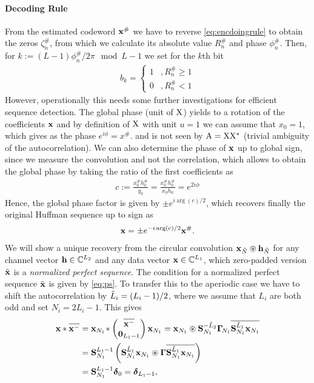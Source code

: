 \documentclass[conference]{IEEEtran}
\begin{document}
\paragraph*{Decoding Rule} From the estimated codeword ${\mathbf x}^{\#}$ we have to reverse \eqref{eq:encdoingrule} to obtain
the zeros $\zeta_n^{\#}$, from which we calculate its absolute value $R_n^{\#}$ and phase $\phi_n^{\#}$. Then, for
$k:=(L-1)\phi_n^{\#}/2\pi \mod L-1$ we set for the $k$th bit 
%
\begin{align}
  b_k =\begin{cases} 1 &, R_n^{\#}\geq 1\\
    0 &, R_n^{\#}<1\end{cases}
\end{align}
%
However, operationally this needs some further investigations for efficient sequence detection.  
%
The global phase (unit of ${\mathrm X}$) yields to a rotation  of the coefficients ${\mathbf x}$ and
by definition of ${\mathrm X}$ with unit $u=1$ we can assume that $x_0=1$, which gives as the phase $e^{i\phi}=x^{\#}$. 
and is not seen by ${\mathrm A}={\mathrm X}{\mathrm X}^*$ (trivial ambiguity of the autocorrelation). We can also determine the phase of ${\mathbf x}$
up to global sign, since we measure the convolution and
not the correlation, which allows to obtain the global phase by taking the ratio of the first coefficients as 
%
\begin{align}
  c:=\frac{x_0^{\#} h_0^{\#}}{y_0}  =\frac{x_0^{\#} h_0^{\#}}{x_0 h_0} = e^{2i\phi}
\end{align}
%
Hence, the global phase factor is given by $\pm e^{i\arg(c)/2}$, which recovers finally the original Huffman sequence up
to sign as
%
\begin{align}
  {\ensuremath{\mathbf x}}= \pm e^{-i\arg(c)/2}{\mathbf x}^{\#}.
\end{align}
%
\fi
{}
\color{brown}
We will show a unique recovery from the circular convolution ${\mathbf x}_{\tilde{N}}\circledast {\ensuremath{\mathbf h}}_{\tilde{N}}$ for any channel vector
${\mathbf h}\in{\ensuremath{\mathbb C}}^{{{L}_2}}$ and any  data vector ${\mathbf x}\in{\ensuremath{\mathbb C}}^{{{L}_1}}$, which zero-padded version $\tilde{\mathbf x}$ is a \emph{normalized perfect
sequence}. The condition for a normalized perfect sequence $\tilde{\mathbf x}$ is given by \eqref{eq:ps}. To transfer this to the
aperiodic case we have to shift the autocorrelation by $\tilde{L}_i= (L_i-1)/2$, where we assume that $L_i$ are
both odd and set $N_i=2L_i-1$. This gives
%
\begin{align}
  {\ensuremath{\mathbf x}}*{\overline{{\mathbf x^{-}}}}&={\mathbf x}_{N_1}\!* \begin{pmatrix} {\ensuremath{\overline{{\mathbf x^{-}}}}}\\ {\mathbf 0}_{L_1-1} \end{pmatrix} {\ensuremath{\mathbf x}}_{N_1}
  ={\mathbf x}_{N_1}\circledast\mathbf S _{N_1}^{-\tilde{L}_2}\mathbf{\Gamma}_{\!N_1}{\overline{\mathbf S _{N_1}^{\tilde{L}_1}{\mathbf x}_{N_1}}}\\
  &= \mathbf S _{N_1}^{L_1-1} \left(\mathbf S _{N_1}^{\tilde{L}_1}  {\mathbf x}_{N_1}\circledast\mathbf{\Gamma}{\overline{\mathbf S _{N_1}^{\tilde{L}_1}{\mathbf x}_{N_1}}}\right)\\
  &=\mathbf S ^{L_1-1}_{N_1}\boldsymbol \delta_0=\boldsymbol \delta_{L_1-1}\label{eq:pstimeN},
\end{align}
\end{document}
